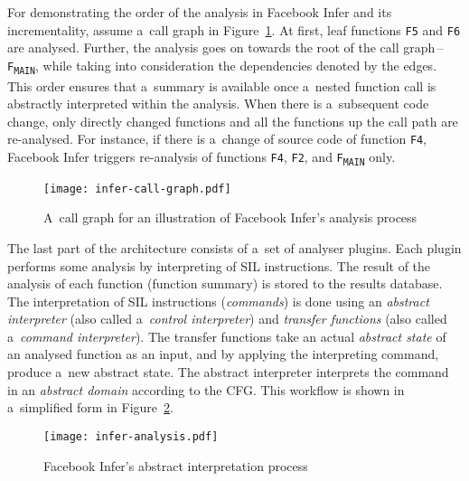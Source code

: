 \begin{example}
    \label{ex:fbinferAnalysis}
    For demonstrating the order of the analysis in Facebook Infer and its
    incrementality, assume a~call graph in Figure~\ref{fig:inferCallGraph}. At
    first, leaf functions \texttt{F5} and \texttt{F6} are analysed. Further,
    the analysis goes on towards the root of the call
    graph\,--\,\texttt{F\textsubscript{MAIN}}, while taking into consideration
    the dependencies denoted by the edges. This order ensures that a~summary is
    available once a~nested function call is abstractly interpreted within the
    analysis. When there is a~subsequent code change, only directly changed
    functions and all the functions up the call path are re-analysed. For
    instance, if there is a~change of source code of function \texttt{F4},
    Facebook Infer triggers re-analysis of functions \texttt{F4}, \texttt{F2},
    and \texttt{F\textsubscript{MAIN}} only.
\end{example}

\begin{figure}[hbt]
    \centering
    \texttt{[image: infer-call-graph.pdf]}
    \caption{%
        A~call graph for an illustration of Facebook Infer's analysis
        process~\cite{harmimBP, excel2019FBInfer, projectPracticeMarcin2018}%
    }
    \label{fig:inferCallGraph}
\end{figure}

The last part of the architecture consists of a~set of analyser plugins. Each
plugin performs some analysis by interpreting of SIL instructions. The result
of the analysis of each function (function summary) is stored to the results
database. The interpretation of SIL instructions (\emph{commands}) is done using
an \emph{abstract interpreter} (also called a~\emph{control interpreter}) and
\emph{transfer functions} (also called a~\emph{command interpreter}). The
transfer functions take an actual \emph{abstract state} of an analysed function
as an input, and by applying the interpreting command, produce a~new abstract
state. The abstract interpreter interprets the command in an \emph{abstract
domain} according to the CFG. This workflow is shown in a~simplified form in
Figure~\ref{fig:inferAnalysis}.

\begin{figure}[hbt]
    \centering
    \texttt{[image: infer-analysis.pdf]}
    \caption{%
        Facebook Infer's abstract interpretation
        process~\cite{harmimBP, projectPracticeMarcin2018}%
    }
    \label{fig:inferAnalysis}
\end{figure}

